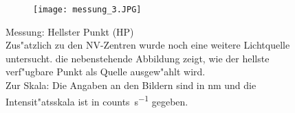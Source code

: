 \begin{figure}[htbp]
        \begin{subfigure}[t][][b]{0.43\textwidth}
            \texttt{[image: messung\_3.JPG]}
        \end{subfigure}
        \hfill
        \begin{minipage}[t][][b]{0.5\textwidth}
            \caption{
                Messung: Hellster Punkt (HP)
                \\
                Zus"atzlich zu den NV-Zentren wurde noch eine weitere Lichtquelle untersucht.
                die nebenstehende Abbildung zeigt, wie der hellste verf"ugbare Punkt als Quelle ausgew"ahlt wird.
                \\
                Zur Skala: Die Angaben an den Bildern sind in \si{\nano\metre} und die Intensit"atsskala ist in \si{counts\per\second} gegeben.
                }
            \label{fig:hell}
        \end{minipage}
\end{figure}


